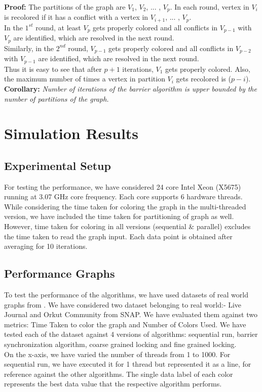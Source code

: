\documentclass[a4paper,11pt]{article}
\begin{document}
\textbf{Proof:} The partitions of the graph are $V_1$, $V_2$, ... , $V_p$. In each round, vertex in $V_i$ is recolored if it has a conflict with a vertex in $V_{i+1}$, ... , $V_p$.\\
\newline
In the $1^{st}$ round, at least $V_p$ gets properly colored and all conflicts in $V_{p-1}$ with $V_p$ are identified, which are resolved in the next round. \\Similarly, in the $2^{nd}$ round, $V_{p-1}$ gets properly colored and all conflicts in $V_{p-2}$ with $V_{p-1}$ are identified, which are resolved in the next round. \\
\newline
Thus it is easy to see that after $p+1$ iterations, $V_1$ gets properly colored. Also, the maximum number of times a vertex in partition $V_i$ gets recolored is ($p - i$). \\
\newline
\textbf{Corollary:} \textit{Number of iterations of the barrier algorithm is upper bounded by the number of partitions of the graph.}

\section{Simulation Results}
\subsection{Experimental Setup}
For testing the performance, we have considered 24 core Intel Xeon (X5675) running at 3.07 GHz core frequency. Each core supports 6 hardware threads. While considering the time taken for coloring the graph in the multi-threaded version, we have included the time taken for partitioning of graph as well. However, time taken for coloring in all versions (sequential \& parallel) excludes the time taken to read the graph input. Each data point is obtained after averaging for 10 iterations.
\subsection{Performance Graphs}
To test the performance of the algorithms, we have used datasets of real world graphs from \cite{snapnets}. We have considered two dataset belonging to real world:- Live Journal and Orkut Community from SNAP. We have evaluated them against two metrics: Time Taken to color the graph and Number of Colors Used. We have tested each of the dataset against 4 versions of algorithms: sequential run, barrier synchronization algorithm, coarse grained locking and fine grained locking.\\
On the x-axis, we have varied the number of threads from 1 to 1000. For sequential run, we have executed it for 1 thread but represented it as a line, for reference against the other algorithms. The single data label of each color represents the best data value that the respective algorithm performs. \\
\end{document}
